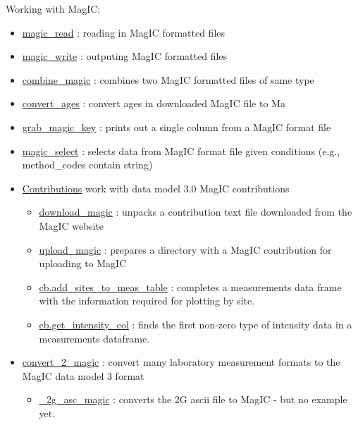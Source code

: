 \documentclass[11pt]{book}
\begin{document}
{{Working with MagIC:
\begin{itemize}
\item \href{http://pmagpy.github.io/PmagPy.html#magic_read}{magic\_read} : reading in MagIC formatted files
\item \href{http://pmagpy.github.io/PmagPy.html#magic_write}{magic\_write} : outputing MagIC formatted files
\item \href{http://pmagpy.github.io/PmagPy.html#combine_magic}{combine\_magic} : combines two MagIC formatted files of same type
\item \href{http://pmagpy.github.io/PmagPy.html#convert_ages}{convert\_ages} : convert ages in downloaded MagIC file to Ma
\item \href{http://pmagpy.github.io/PmagPy.html#grab_magic_key}{grab\_magic\_key} : prints out a single column from a MagIC format file
\item \href{http://pmagpy.github.io/PmagPy.html#magic_select}{magic\_select} : selects data from MagIC format file given conditions (e.g., method\_codes contain string)
\item \href{http://pmagpy.github.io/PmagPy.html#Contributions}{Contributions} work with data model 3.0 MagIC contributions
  \begin{itemize}
\item \href{http://pmagpy.github.io/PmagPy.html#download_magic}{download\_magic} : unpacks a contribution text file downloaded from the MagIC website
\item \href{http://pmagpy.github.io/PmagPy.html#upload_magic}{upload\_magic} : prepares a directory with a MagIC contribution for uploading to MagIC
\item \href{http://pmagpy.github.io/PmagPy.html#cb.add_sites_to_meas_table}{cb.add\_sites\_to\_meas\_table} : completes a measurements data frame with the information required for plotting by site.
\item \href{http://pmagpy.github.io/PmagPy.html#cb.get_intensity_col}{cb.get\_intensity\_col} : finds the first non-zero type of intensity data in a measurements dataframe.
  \end{itemize}
\item \href{http://pmagpy.github.io/PmagPy.html#convert_2_magic}{convert\_2\_magic} : convert many laboratory measurement formats to the MagIC data model 3 format
  \begin{itemize}
\item \href{http://pmagpy.github.io/PmagPy.html#_2g_asc_magic}{\_2g\_asc\_magic} : converts the 2G ascii file to MagIC - but no example yet.

\end{itemize}
\end{itemize}}}
\end{document}
